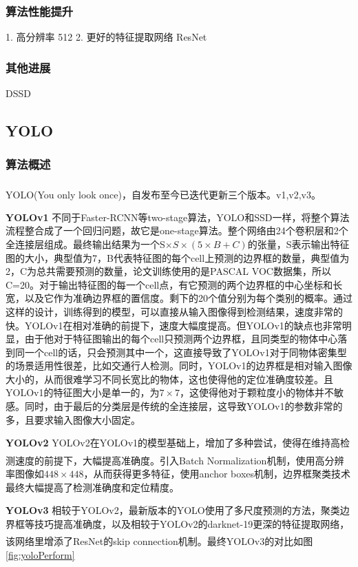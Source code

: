 \documentclass[12pt,a4paper,titlepage]{article}
\newcommand{\upcite}[1]{\textsuperscript{\textsuperscript{\cite{#1}}}}  %
\begin{document}
\begin{figure}[t]
\label{fig:ssdDetect}
\end{figure}


\subsubsection{算法性能提升}
1. 高分辨率  512
2. 更好的特征提取网络 ResNet

\subsubsection{其他进展}
DSSD


\subsection{YOLO}
\subsubsection{算法概述}
YOLO(You only look once)，自发布至今已迭代更新三个版本。v1\upcite{redmon2016you},v2\upcite{redmon2017yolo9000},v3\upcite{}。\par
\textbf{YOLOv1} 不同于Faster-RCNN等two-stage算法，YOLO和SSD一样，将整个算法流程整合成了一个回归问题，故它是one-stage算法。整个网络由24个卷积层和2个全连接层组成。最终输出结果为一个S$\times S \times(5\times B + C)$的张量，S表示输出特征图的大小，典型值为7，B代表特征图的每个cell上预测的边界框的数量，典型值为2，C为总共需要预测的数量，论文训练使用的是PASCAL VOC数据集，所以C=20。对于输出特征图的每一个cell点，有它预测的两个边界框的中心坐标和长宽，以及它作为准确边界框的置信度。剩下的20个值分别为每个类别的概率。通过这样的设计，训练得到的模型，可以直接从输入图像得到检测结果，速度非常的快。YOLOv1在相对准确的前提下，速度大幅度提高。但YOLOv1的缺点也非常明显，由于他对于特征图输出的每个cell只预测两个边界框，且同类型的物体中心落到同一个cell的话，只会预测其中一个，这直接导致了YOLOv1对于同物体密集型的场景适用性很差，比如交通行人检测。同时，YOLOv1的边界框是相对输入图像大小的，从而很难学习不同长宽比的物体，这也使得他的定位准确度较差。且YOLOv1的特征图大小是单一的，为$7\times 7$，这使得他对于颗粒度小的物体并不敏感。同时，由于最后的分类层是传统的全连接层，这导致YOLOv1的参数非常的多，且要求输入图像大小固定。\par
\textbf{YOLOv2}  YOLOv2在YOLOv1的模型基础上，增加了多种尝试，使得在维持高检测速度的前提下，大幅提高准确度。引入Batch Normalization\upcite{ioffe2015batch}机制，使用高分辨率图像如$448 \times 448$，从而获得更多特征，使用anchor boxes机制，边界框聚类技术最终大幅提高了检测准确度和定位精度。\par
\textbf{YOLOv3}  相较于YOLOv2，最新版本的YOLO使用了多尺度预测的方法，聚类边界框等技巧提高准确度，以及相较于YOLOv2的darknet-19更深的特征提取网络，该网络里增添了ResNet\upcite{he2016deep}的skip connection机制。最终YOLOv3的对比如图\ref{fig:yoloPerform}
\end{document}
